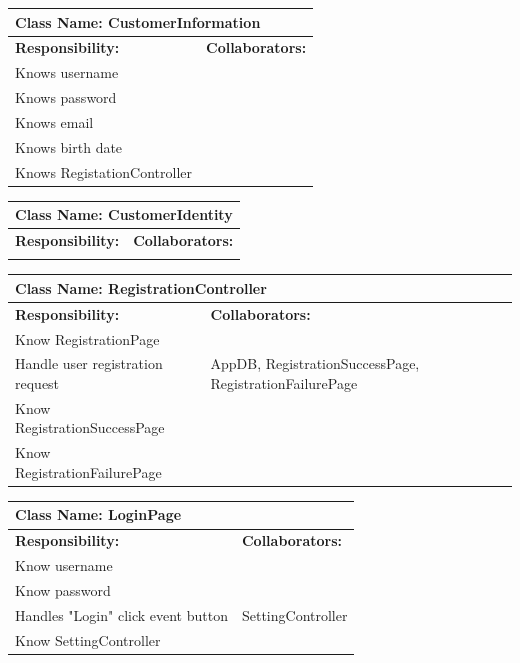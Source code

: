 \documentclass[]{article}
\begin{document}
\begin{table}[ht]
\centering
\begin{tabular}{|p{6cm}|p{6cm}|}
\hline 
 \multicolumn{2}{|l|}{\textbf{Class Name: CustomerInformation}} \\
\hline
\textbf{Responsibility:} & \textbf{Collaborators:} \\
\hline 
Knows username&\\ \hline
Knows password&\\ \hline 
Knows email&\\ \hline 
Knows birth date&\\ \hline 
Knows RegistationController &\\ \hline
\end{tabular}
\end{table}

\begin{table}[ht]
\centering
\begin{tabular}{|p{6cm}|p{6cm}|}
\hline 
 \multicolumn{2}{|l|}{\textbf{Class Name: CustomerIdentity}} \\
\hline
\textbf{Responsibility:} & \textbf{Collaborators:} \\
\hline 
\vspace{1in} & \\
\hline
\end{tabular}
\end{table}

\begin{table}[ht]
\centering
\begin{tabular}{|p{6cm}|p{6cm}|}
\hline 
 \multicolumn{2}{|l|}{\textbf{Class Name: RegistrationController}} \\
\hline
\textbf{Responsibility:} & \textbf{Collaborators:} \\
\hline
Know RegistrationPage&\\ \hline
Handle user registration request & AppDB, RegistrationSuccessPage, RegistrationFailurePage\\ \hline
Know RegistrationSuccessPage &\\ \hline
Know RegistrationFailurePage &\\ \hline
\end{tabular}
\end{table}

\begin{table}[ht]
\centering
\begin{tabular}{|p{6cm}|p{6cm}|}
\hline 
 \multicolumn{2}{|l|}{\textbf{Class Name: LoginPage}} \\
\hline
\textbf{Responsibility:} & \textbf{Collaborators:} \\
\hline
Know username & \\ \hline
Know password & \\ \hline
Handles "Login" click event button & SettingController\\ \hline
Know SettingController &\\ \hline
\end{tabular}
\end{table}
\end{document}
